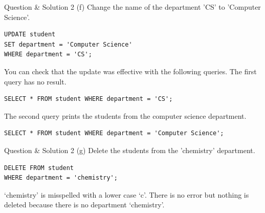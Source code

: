 \begin{frame}[fragile]{Question \& Solution 2 (f)}
Change the name of the department 'CS' to 'Computer Science'.

\begin{lstlisting}
UPDATE student
SET department = 'Computer Science'
WHERE department = 'CS';
\end{lstlisting}

You can check that the update was effective with the following queries.
The first query has no result.
\begin{lstlisting}
SELECT * FROM student WHERE department = 'CS';
\end{lstlisting}

The second query prints the students from the computer science department.
\begin{lstlisting}
SELECT * FROM student WHERE department = 'Computer Science';
\end{lstlisting}
\end{frame}

\begin{frame}[fragile]{Question \& Solution 2 (g)}
Delete the students from the 'chemistry' department.

\begin{lstlisting} 
DELETE FROM student 
WHERE department = 'chemistry';
\end{lstlisting}

`chemistry' is misspelled with a lower case `c'. There is no error but nothing is deleted because there is no department `chemistry'.
\end{frame}

